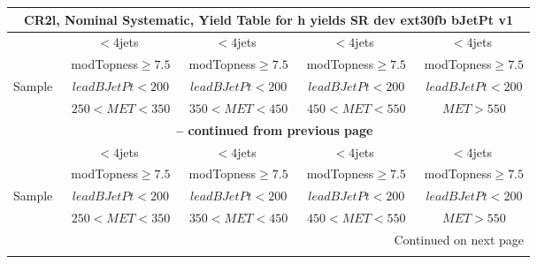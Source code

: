 \documentclass{article}
\begin{document}
\begin{longtable}{|l|c|c|c|c|} 
 
\multicolumn{5}{c}{ CR2l, Nominal Systematic, Yield Table for h yields SR dev ext30fb bJetPt v1 }\\* \hline 
  & $<4$jets  & $<4$jets  & $<4$jets  & $<4$jets \\* 
  & ~modTopness$\ge7.5$  & ~modTopness$\ge7.5$  & ~modTopness$\ge7.5$  & ~modTopness$\ge7.5$ \\* 
Sample  & ~$leadBJetPt<200$  & ~$leadBJetPt<200$  & ~$leadBJetPt<200$  & ~$leadBJetPt<200$ \\* 
  & ~$250<MET<350$  & ~$350<MET<450$  & ~$450<MET<550$  & ~$MET>550$ \\* 
\hline \hline 
\endfirsthead 
 
\multicolumn{5}{c}{{\bfseries \tablename\ \thetable{} -- continued from previous page}}\\* \hline 
  & $<4$jets  & $<4$jets  & $<4$jets  & $<4$jets \\* 
  & ~modTopness$\ge7.5$  & ~modTopness$\ge7.5$  & ~modTopness$\ge7.5$  & ~modTopness$\ge7.5$ \\* 
Sample  & ~$leadBJetPt<200$  & ~$leadBJetPt<200$  & ~$leadBJetPt<200$  & ~$leadBJetPt<200$ \\* 
  & ~$250<MET<350$  & ~$350<MET<450$  & ~$450<MET<550$  & ~$MET>550$ \\* 
\hline \hline 
\endhead 
 
\multicolumn{5}{|r|}{{Continued on next page}}\\* \hline 
\endfoot 
 
 
\endlastfoot 
 

\end{longtable}
\end{document}
